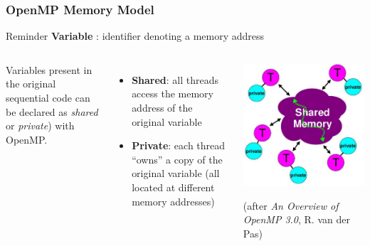 \documentclass{beamer}
\begin{document}
\begin{frame}
  \frametitle{OpenMP Memory Model}

  \begin{block}{Reminder}
    \textbf{Variable} : \alert{identifier} denoting a \alert{memory address}
  \end{block}
  
  \begin{columns}[t]

    Variables present in the original sequential code can be declared as {\it shared}
    or {\it private}) with OpenMP.

    \medskip
    
    \begin{itemize}
    \item \textbf{Shared}: all threads access the memory address of the original variable 

    \item \textbf{Private}: each thread ``owns'' a \alert{copy} %
      of the original variable (all located at different memory addresses)
    \end{itemize}
    
    \begin{center}
      \includegraphics[width=\textwidth]{modele_mem_OpenMP}    

      {\tiny (after {\it An Overview of OpenMP 3.0}, R. van der Pas)} 
    \end{center}
  \end{columns}


\end{frame}
\end{document}

